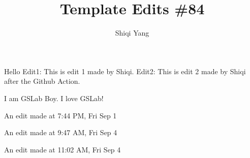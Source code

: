 \documentclass{report}
\title{\Huge{Template Edits \#84}\\}
\author{\huge{Shiqi Yang}}
\date{}
\begin{document}
\maketitle
Hello
Edit1: This is edit 1 made by Shiqi.
Edit2: This is edit 2 made by Shiqi after the Github Action.


I am GSLab Boy. I love GSLab!

An edit made at 7:44 PM, Fri Sep 1

An edit made at 9:47 AM, Fri Sep 4

An edit made at 11:02 AM, Fri Sep 4
\end{document}
